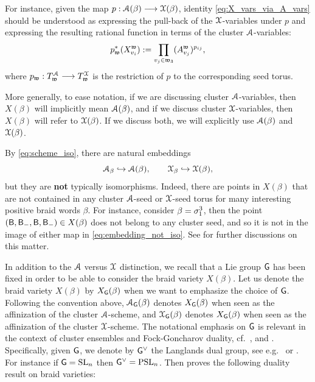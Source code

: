 \begin{example}\label{ex:X_in_terms_of_A} For instance, given the map $p:\mathcal{A}(\beta)\longrightarrow\mathcal{X}(\beta)$, identity \eqref{eq:X_vars_via_A_vars} should be understood as expressing the pull-back of the $\mathcal{X}$-variables under $p$ and expressing the resulting rational function in terms of the cluster $\mathcal{A}$-variables:
$$p_{\mathfrak{w}}^*(X^{\mathfrak{w}}_{v_i}) := \prod_{v_j\in\mathfrak{w}_3} (A^{\mathfrak{w}}_{v_j}) ^{p_{ij}},$$
where $p_{\mathfrak{w}}:T_{\mathfrak{w}}^{\mathcal{A}}\longrightarrow T_{\mathfrak{w}}^{\mathcal{X}}$ is the restriction of $p$ to the corresponding seed torus.\sbs
\end{example}

More generally, to ease notation, if we are discussing cluster $\mathcal{A}$-variables, then $X(\beta)$ will implicitly mean $\mathcal{A}(\beta)$, and if we discuss cluster $\mathcal{X}$-variables, then $X(\beta)$ will refer to $\mathcal{X}(\beta)$. If we discuss both, we will explicitly use $\mathcal{A}(\beta)$ and $\mathcal{X}(\beta)$. 

\begin{remark}\label{rmk:embedding_not_iso}
By \eqref{eq:scheme_iso}, there are natural embeddings
\begin{equation}\label{eq:embedding_not_iso}
\mathcal{A}_\beta\hookrightarrow \mathcal{A}(\beta),\qquad \mathcal{X}_\beta\hookrightarrow \mathcal{X}(\beta),
\end{equation}
but they are {\bf not} typically isomorphisms. Indeed, there are points in $X(\beta)$ that are not contained in any cluster $\mathcal{A}$-seed or $\mathcal{X}$-seed torus for many interesting positive braid words $\beta$. For instance, consider $\beta=\sigma_1^3$, then the point $(\mathsf{B},\mathsf{B}_-,\mathsf{B},\mathsf{B}_-)\in X(\beta)$ does not belong to any cluster seed, and so it is not in the image of either map in \eqref{eq:embedding_not_iso}. See \cite{CGSS_clusterdeeploci} for further discussions on this matter.\sbs
\end{remark}

In addition to the $\mathcal{A}$ versus $\mathcal{X}$ distinction, we recall that a Lie group $\mathsf{G}$ has been fixed in order to be able to consider the braid variety $X(\beta)$. Let us denote the braid variety $X(\beta)$ by $X_{\mathsf{G}}(\beta)$ when we want to emphasize the choice of $\mathsf{G}$. Following the convention above, $\mathcal{A}_{\mathsf{G}}(\beta)$ denotes $X_{\mathsf{G}}(\beta)$ when seen as the affinization of the cluster $\mathcal{A}$-scheme, and $\mathcal{X}_{\mathsf{G}}(\beta)$ denotes $X_{\mathsf{G}}(\beta)$ when seen as the affinization of the cluster $\mathcal{X}$-scheme. The notational emphasis on $\mathsf{G}$ is relevant in the context of cluster ensembles and Fock-Goncharov duality, cf.~\cite[Sections 1.2.9 \& 1.2.10]{FG09}, \cite[Definition A.4]{GHKK18} and \cite[Section 7]{GHK15}. Specifically, given $\mathsf{G}$, we denote by $\mathsf{G}^\vee$ the Langlands dual group, see e.g.~\cite[Appendix A]{GHKK18} or \cite[Section 1.17]{FG2006}. For instance if $\mathsf{G}=\operatorname{SL}_n$ then $\mathsf{G}^\vee=\operatorname{PSL}_n$. Then \cite[Theorem 8.8]{CGGLSS25} proves the following duality result on braid varieties:

